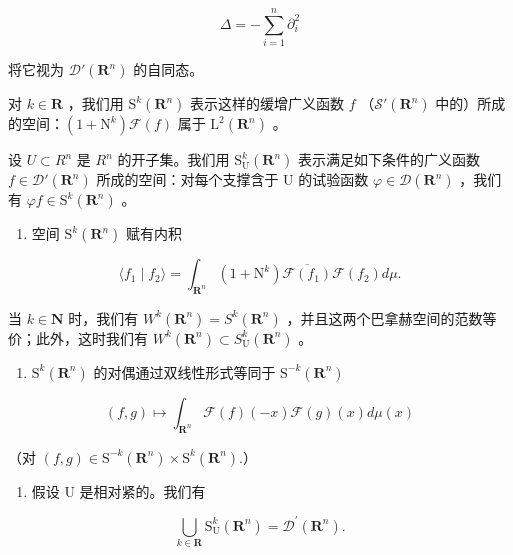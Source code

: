 \[
\Delta = - \sum_ {i = 1} ^ {n} \partial_ {i} ^ {2}
\]

将它视为 \(\mathcal{D}'(\mathbf{R}^{n})\) 的自同态。

对 \(k \in \mathbf{R}\) ，我们用 \(\mathrm{S}^k(\mathbf{R}^n)\) 表示这样的缓增广义函数 \(f\) （\(\mathcal{S}'(\mathbf{R}^n)\) 中的）所成的空间：\((1 + \mathrm{N}^k)\mathcal{F}(f)\) 属于 \(\mathrm{L}^2(\mathbf{R}^n)\) 。

设 \(U \subset R^{n}\) 是 \(R^{n}\) 的开子集。我们用 \(\mathrm{S}_{\mathrm{U}}^{k}(\mathbf{R}^{n})\) 表示满足如下条件的广义函数 \(f \in \mathcal{D}'(\mathbf{R}^{n})\) 所成的空间：对每个支撑含于 U 的试验函数 \(\varphi \in \mathcal{D}(\mathbf{R}^{n})\) ，我们有 \(\varphi f \in \mathrm{S}^{k}(\mathbf{R}^{n})\) 。

\begin{enumerate}
\def\labelenumi{\alph{enumi})}
\tightlist
\item
  空间 \(\mathrm{S}^{k}(\mathbf{R}^{n})\) 赋有内积
\end{enumerate}

\[
\langle f _ {1} \mid f _ {2} \rangle = \int_ {\mathbf {R} ^ {n}} (1 + \mathrm{N} ^ {k}) \overline {{\mathcal {F} (f _ {1})}} \mathcal {F} (f _ {2}) d \mu .
\]

当 \(k \in \mathbf{N}\) 时，我们有 \(W^{k}(\mathbf{R}^{n}) = S^{k}(\mathbf{R}^{n})\) ，并且这两个巴拿赫空间的范数等价；此外，这时我们有 \(W^{k}(\mathbf{R}^{n}) \subset S_{\mathrm{U}}^{k}(\mathbf{R}^{n})\) 。

\begin{enumerate}
\def\labelenumi{\alph{enumi})}
\setcounter{enumi}{1}
\tightlist
\item
  \(\mathrm{S}^{k}(\mathbf{R}^{n})\) 的对偶通过双线性形式等同于 \(\mathrm{S}^{-k}(\mathbf{R}^{n})\)
\end{enumerate}

\[
(f, g) \mapsto \int_ {\mathbf {R} ^ {n}} \mathcal {F} (f) (- x) \mathcal {F} (g) (x) d \mu (x)
\]

（对 \((f,g)\in \mathrm{S}^{-k}(\mathbf{R}^n)\times \mathrm{S}^k (\mathbf{R}^n).\)）

\begin{enumerate}
\def\labelenumi{\alph{enumi})}
\setcounter{enumi}{2}
\tightlist
\item
  假设 U 是相对紧的。我们有
\end{enumerate}

\[
\bigcup_ {k \in \mathbf {R}} \mathrm{S} _ {\mathrm{U}} ^ {k} (\mathbf {R} ^ {n}) = \mathcal {D} ^ {\prime} (\mathbf {R} ^ {n}).
\]

